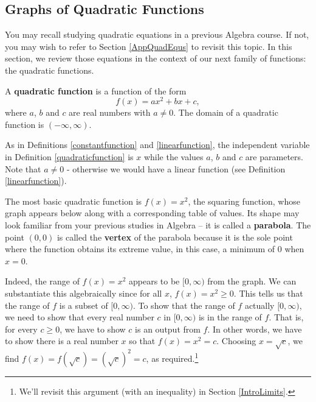 

\setcounter{footnote}{0}

\label{QuadraticFunctions}

\subsection{Graphs of Quadratic Functions}
\label{GraphsofQuadraticFunctions}


You may recall studying quadratic equations in a previous Algebra course.  If not, you may wish to refer to Section \ref{AppQuadEqus} to revisit this topic. In this section, we review those equations in the context of our next family of functions: the quadratic functions.

\medskip

\colorbox{ResultColor}{\bbm

\begin{defn} \label{quadraticfunction} A \textbf{quadratic function} is a function of the form \[ f(x) = ax^2 + bx + c,\] where $a$, $b$ and $c$ are real numbers with $a \neq 0$.  The domain of a quadratic function is $(-\infty, \infty)$.

\end{defn}

\ebm}

\medskip

As in Definitions \ref{constantfunction} and \ref{linearfunction}, the independent variable in Definition \ref{quadraticfunction} is $x$ while the  values $a$, $b$ and $c$ are parameters. Note that $a \neq 0$ - otherwise we would have a linear function (see Definition  \ref{linearfunction}).

\medskip

The most basic quadratic function is $f(x) = x^2$, the squaring function, whose graph appears below along with a corresponding table of values. Its shape may look familiar from your previous studies in Algebra -- it is called a  \textbf{parabola}. The point $(0,0)$ is called the \textbf{vertex} of the parabola because it is the sole point where the function obtains its extreme value, in this case, a minimum of $0$ when $x = 0$. 

\medskip

Indeed, the range of $f(x) = x^2$ appears to be $[0, \infty)$ from the graph. We can substantiate this algebraically since for all $x$, $f(x) = x^2 \geq 0$.  This tells us that the range of $f$ is a subset of $[0, \infty)$.  To show that the range of $f$ actually  $[0, \infty)$, we need to show that every real number $c$ in $[0, \infty)$ is in the range of $f$.  That is, for every $c \geq 0$, we have to show $c$ is an output from $f$.  In other words, we have to show there is a real number $x$ so that  $f(x) = x^2 = c$.  Choosing $x = \sqrt{c}$, we find $f(x) = f(\sqrt{c}) = (\sqrt{c})^2 = c$, as required.\footnote{We'll revisit this argument (with an inequality) in Section \ref{IntroLimits}.} 

